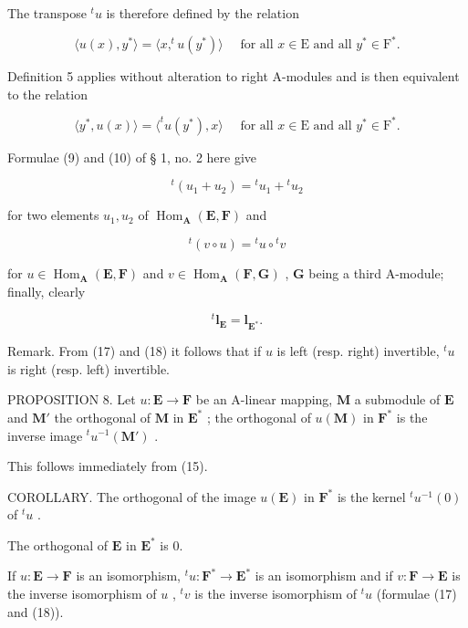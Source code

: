 The transpose \(^{t}u\) is therefore defined by the relation

\[
\langle u (x), y ^ {*} \rangle = \langle x, ^ {t} u (y ^ {*}) \rangle \quad \text { for   all } x \in \mathrm{E} \text { and   all } y ^ {*} \in \mathrm{F} ^ {*}.\tag{15}
\]

Definition 5 applies without alteration to right A-modules and is then equivalent to the relation

\[
\langle y ^ {*}, u (x) \rangle = \langle^ {t} u (y ^ {*}), x \rangle \quad \text { for   all } x \in \mathrm{E} \text { and   all } y ^ {*} \in \mathrm{F} ^ {*}.
\]

Formulae (9) and (10) of § 1, no. 2 here give

\[
{ } ^ { t } ( u _ { 1 } + u _ { 2 } ) = { } ^ { t } u _ { 1 } + { } ^ { t } u _ { 2 }\tag{16}
\]

for two elements \(u_{1}, u_{2}\) of \(\operatorname{Hom}_{\mathbf{A}}(\mathbf{E}, \mathbf{F})\) and

\[
{ } ^ { t } ( v \circ u ) = { } ^ { t } u \circ { } ^ { t } v\tag{17}
\]

for \(u \in \operatorname{Hom}_{\mathbf{A}}(\mathbf{E}, \mathbf{F})\) and \(v \in \operatorname{Hom}_{\mathbf{A}}(\mathbf{F}, \mathbf{G})\) , \(\mathbf{G}\) being a third A-module; finally, clearly

\[
{ } ^ { t } \mathbf { l } _ { \mathbf { E } } = \mathbf { l } _ { \mathbf { E } ^ { * } } .\tag{18}
\]

Remark. From (17) and (18) it follows that if \(u\) is left (resp. right) invertible, \(^{t}u\) is right (resp. left) invertible.

PROPOSITION 8. Let \(u: \mathbf{E} \to \mathbf{F}\) be an A-linear mapping, \(\mathbf{M}\) a submodule of \(\mathbf{E}\) and \(\mathbf{M}'\) the orthogonal of \(\mathbf{M}\) in \(\mathbf{E}^*\) ; the orthogonal of \(u(\mathbf{M})\) in \(\mathbf{F}^*\) is the inverse image \(^t u^{-1}(\mathbf{M}')\) .

This follows immediately from (15).

COROLLARY. The orthogonal of the image \(u(\mathbf{E})\) in \(\mathbf{F}^*\) is the kernel \({}^t u^{-1}(0)\) of \({}^t u\) .

The orthogonal of \(\mathbf{E}\) in \(\mathbf{E}^*\) is 0.

If \(u: \mathbf{E} \to \mathbf{F}\) is an isomorphism, \({}^{t}u: \mathbf{F}^{*} \to \mathbf{E}^{*}\) is an isomorphism and if \(v: \mathbf{F} \to \mathbf{E}\) is the inverse isomorphism of \(u\) , \({}^{t}v\) is the inverse isomorphism of \({}^{t}u\) (formulae (17) and (18)).

